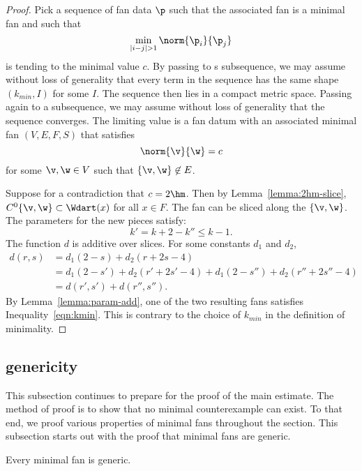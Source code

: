 \begin{proof} 
  Pick a sequence of fan data $\p$ such that the associated fan is a
  minimal fan and such that
\[ 
\min_{|i-j|>1} \norm{\p_i}{\p_j}
\] 
is tending to the minimal value $c$.  By passing to s subsequence, we
may assume without loss of generality that every term in the sequence
has the same shape $(k_{min},I)$ for some $I$.  The sequence then lies
in a compact metric space.  Passing again to a subsequence, we may
assume without loss of generality that the sequence converges.  The
limiting value is a fan datum with an associated minimal fan $(V,E,F,S)$ that
satisfies
\[ 
\norm{\v}{\w}=c
\] 
for some $\v,\w\in V$ such that $\{\v,\w\}\not\in E$.

Suppose for a contradiction that $c=2\hm$.  Then by
Lemma~\ref{lemma:2hm-slice}, $C^0\{\v,\w\}\subset \Wdart(x)$ for all
$x\in F$.  The fan can be sliced along the $\{\v,\w\}$.  The
parameters for the new pieces satisfy:
\[ 
k' = k+2 - k'' \le k-1.
\] 
The function $d$ is additive over slices.  For some constants $d_1$
and $d_2$,
\begin{align}\label{eqn:drs}
d(r,s) &= d_1 (2 - s) + d_2 (r + 2 s-4) \nonumber\\
&= d_1 (2-s') + d_2 (r'+2 s'-4) + d_1 (2-s'') + d_2 (r''+2s''-4)\nonumber\\
&= d(r',s') + d(r'',s'').
\end{align}
By Lemma~\ref{lemma:param-add}, one of the two resulting fans
satisfies Inequality~\ref{eqn:kmin}.  This is contrary to the choice
of $k_{min}$ in the definition of minimality.
\end{proof}





\subsection{genericity}

This subsection continues to prepare for the proof of the main
estimate.  The method of proof is to show that no minimal
counterexample can exist.  To that end, we proof various properties of
minimal fans throughout the section.  This subsection starts out with
the proof that minimal fans are generic.

\begin{lemma}[]\label{lemma:circular-nonmin}
Every minimal fan is generic.
\end{lemma}

